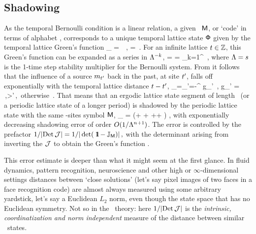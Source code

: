 \subsection{Shadowing}
\label{s:bernShadow}

As the {temporal Bernoulli} condition  is a linear
relation, a given \brick\ $\mathsf{M}$, or `code' in terms of alphabet
, corresponds to a unique temporal lattice state $\mathsf{\Phi}$
given by the temporal lattice Green's function
\beq
\Xx_\Mm
= \gd\,\Mm
\,,\qquad
\gd = 
\,.
For an infinite lattice $\zeit\in\integers$, this Green's function can be
expanded as a series in $\ExpaEig^{-k}$,
\beq
\gd
    = \frac{\,{\hopMat}/{\ExpaEig}}{\id-{\hopMat/}{\ExpaEig}}
    = \sum_{k=1}^\infty {}
\,,
where $\ExpaEig={s}$ is the 1-time step stability multiplier for the
Bernoulli system. From  it follows that
the influence of a source $\Ssym{\zeit'}$ back in the
past, at site $\zeit'$, falls off exponentially with the temporal lattice
distance $\zeit-\zeit'$,
\beq
  \ssp_{\zeit}=\sum_{\zeit'=-\infty}^{} g_{\zeit\zeit'} 
\,, \quad
g_{\zeit\zeit'}
   =
\,,\quad \zeit>\zeit'\,,\mbox{ otherwise}
\,.
That means that an ergodic lattice state segment of length \cl{}\ (or a
periodic {lattice state} of a longer period) is shadowed by the periodic
{lattice state}  with the same \cl{}-sites {symbol
\brick} $\Mm$,
\beq
\ssp_{\zeit}
=  
\left(+
      +\cdots
      ++\frac{\Ssym{\cl{}}}{\ExpaEig^{\cl{}}}
\right)
,
\label{Bern_cyc}
\eeq
with exponentially
decreasing shadowing error of order $O(1/\Lambda^{{n_{}}+1})$. The error
is controlled by the  prefactor
\(
1/|\mbox{\rm Det}\,{\mathcal{J}}| = 1/|\det({\ \hbox{{\rm 1}\kern-.62em\hbox{\rm 1}}} - \mathbb{J}_{\mathsf{M}})|\,,
\)
with the determinant arising from inverting the {\jacobianOrb}
${\mathcal{J}}$ to obtain the Green's function .

This error estimate is deeper than what it might seem at the first
glance. In fluid dynamics, pattern recognition, neuroscience and other
high or $\infty$-dimensional settings distances between `close solutions'
(let's say pixel images of two faces in a face recognition code) are
almost always measured using some arbitrary yardstick, let's say a
Euclidean $L_2$ norm,
even though the state space that has no Euclidean symmetry.
Not so in the \po\ theory: here $1/|\mbox{\rm Det}\,{\mathcal{J}}|$ is the \emph{intrinsic,
coordinatization and norm independent} measure of the distance between
similar \spt\ states.

